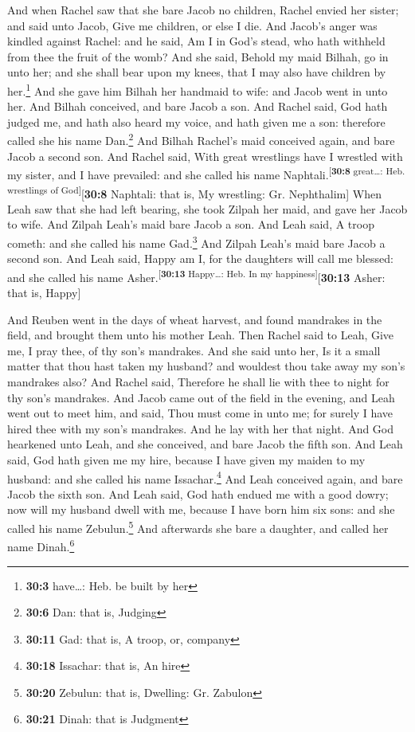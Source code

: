  And when Rachel saw that she bare Jacob no children,
Rachel envied her sister; and said unto Jacob, Give me children, or else
I die.  And Jacob's anger was kindled against Rachel: and
he said, Am I in God's stead, who hath withheld from thee the fruit of
the womb?  And she said, Behold my maid Bilhah, go in unto
her; and she shall bear upon my knees, that I may also have children by
her.\footnote{\textbf{30:3} have\ldots: Heb. be built by her}
 And she gave him Bilhah her handmaid to wife: and Jacob
went in unto her.  And Bilhah conceived, and bare Jacob a
son.  And Rachel said, God hath judged me, and hath also
heard my voice, and hath given me a son: therefore called she his name
Dan.\footnote{\textbf{30:6} Dan: that is, Judging}  And
Bilhah Rachel's maid conceived again, and bare Jacob a second son.
 And Rachel said, With great wrestlings have I wrestled
with my sister, and I have prevailed: and she called his name
Naphtali.\textsuperscript{{[}\textbf{30:8} great\ldots: Heb. wrestlings
of God{]}}{[}\textbf{30:8} Naphtali: that is, My wrestling: Gr.
Nephthalim{]}  When Leah saw that she had left bearing,
she took Zilpah her maid, and gave her Jacob to wife. 
And Zilpah Leah's maid bare Jacob a son.  And Leah said,
A troop cometh: and she called his name Gad.\footnote{\textbf{30:11}
  Gad: that is, A troop, or, company}  And Zilpah Leah's
maid bare Jacob a second son.  And Leah said, Happy am I,
for the daughters will call me blessed: and she called his name
Asher.\textsuperscript{{[}\textbf{30:13} Happy\ldots: Heb. In my
happiness{]}}{[}\textbf{30:13} Asher: that is, Happy{]}

 And Reuben went in the days of wheat harvest, and found
mandrakes in the field, and brought them unto his mother Leah. Then
Rachel said to Leah, Give me, I pray thee, of thy son's mandrakes.
 And she said unto her, Is it a small matter that thou
hast taken my husband? and wouldest thou take away my son's mandrakes
also? And Rachel said, Therefore he shall lie with thee to night for thy
son's mandrakes.  And Jacob came out of the field in the
evening, and Leah went out to meet him, and said, Thou must come in unto
me; for surely I have hired thee with my son's mandrakes. And he lay
with her that night.  And God hearkened unto Leah, and
she conceived, and bare Jacob the fifth son.  And Leah
said, God hath given me my hire, because I have given my maiden to my
husband: and she called his name Issachar.\footnote{\textbf{30:18}
  Issachar: that is, An hire}  And Leah conceived again,
and bare Jacob the sixth son.  And Leah said, God hath
endued me with a good dowry; now will my husband dwell with me, because
I have born him six sons: and she called his name Zebulun.\footnote{\textbf{30:20}
  Zebulun: that is, Dwelling: Gr. Zabulon}  And
afterwards she bare a daughter, and called her name Dinah.\footnote{\textbf{30:21}
  Dinah: that is Judgment}

